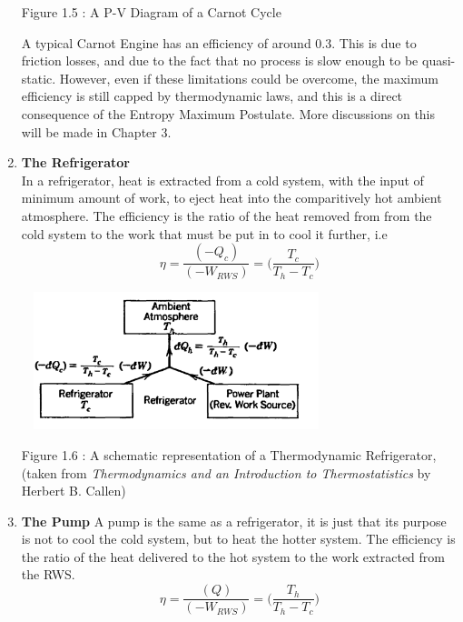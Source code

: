 \documentclass[oneside]{book}
\begin{document}
\begin{enumerate}
\begin{center}
\end{center}
\begin{center}
Figure 1.5 : A P-V Diagram of a Carnot Cycle\\
\end{center}
	A typical Carnot Engine has an efficiency of around 0.3. This is due to friction losses, and due to the fact that no process is slow enough to be quasi-static. However, even if these limitations could be overcome, the maximum efficiency is still capped by thermodynamic laws, and this is a direct consequence of the Entropy Maximum Postulate. More discussions on this will be made in Chapter 3.
	\item \textbf{The Refrigerator}\\ 
	In a refrigerator, heat is extracted from a cold system, with the input of minimum amount of work, to eject heat into the comparitively hot ambient atmosphere. The efficiency is the ratio of the heat removed from from the cold system to the work that must be put in to cool it further, i.e
	\[\eta = \frac {(-Q_c)} {(-W_{RWS})}  = \Bigg(\frac {T_{c}} {T_h-T_c}\Bigg) \]
	\begin{center}
\includegraphics[width = 9cm, height = 4cm]{Fridge}
\end{center}
\begin{center}
Figure 1.6 : A schematic representation of a Thermodynamic Refrigerator,\\
(taken from \emph{Thermodynamics and an Introduction to Thermostatistics} by Herbert B. Callen)
\end{center}
	\item \textbf{The Pump}
	A pump is the same as a refrigerator, it is just that its purpose is not to cool the cold system, but to heat the hotter system. The efficiency is the ratio of the heat delivered to the hot system to the work extracted from the RWS.
	\[\eta = \frac {(Q)} {(-W_{RWS})}  = \Bigg(\frac {T_{h}} {T_h-T_c}\Bigg) \]
	\end{enumerate}
	
\end{document}
